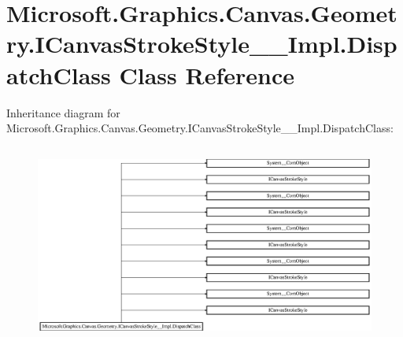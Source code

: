\hypertarget{class_microsoft_1_1_graphics_1_1_canvas_1_1_geometry_1_1_i_canvas_stroke_style_____impl_1_1_dispatch_class}{}\section{Microsoft.\+Graphics.\+Canvas.\+Geometry.\+I\+Canvas\+Stroke\+Style\+\_\+\+\_\+\+Impl.\+Dispatch\+Class Class Reference}
\label{class_microsoft_1_1_graphics_1_1_canvas_1_1_geometry_1_1_i_canvas_stroke_style_____impl_1_1_dispatch_class}
Inheritance diagram for Microsoft.\+Graphics.\+Canvas.\+Geometry.\+I\+Canvas\+Stroke\+Style\+\_\+\+\_\+\+Impl.\+Dispatch\+Class\+:\begin{figure}[H]
\begin{center}
\leavevmode
\includegraphics[height=6.595289cm]{class_microsoft_1_1_graphics_1_1_canvas_1_1_geometry_1_1_i_canvas_stroke_style_____impl_1_1_dispatch_class}
\end{center}
\end{figure}
